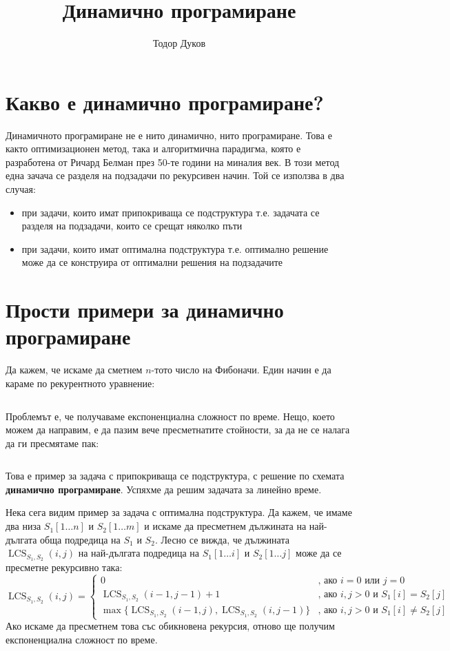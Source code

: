 \documentclass{article}
\title{Динамично програмиране}
\author{Тодор Дуков}
\date{}
\theoremstyle{definition}
\theoremstyle{plain}
\theoremstyle{remark}
\theoremstyle{definition}
\begin{document}
\maketitle

\section*{Какво е динамично програмиране?}

Динамичното програмиране не е нито динамично, нито програмиране.
Това е както оптимизационен метод, така и алгоритмична парадигма, която е разработена от Ричард Белман през 50-те години на миналия век.
В този метод една зачача се разделя на подзадачи по рекурсивен начин.
Той се използва в два случая:
\begin{itemize}
  \item при задачи, които имат припокриваща се подструктура т.е. задачата се разделя на подзадачи, които се срещат няколко пъти
  \item при задачи, които имат оптимална подструктура т.е. оптимално решение може да се конструира от оптимални решения на подзадачите
\end{itemize}

\section*{Прости примери за динамично програмиране}

Да кажем, че искаме да сметнем $n$-тото число на Фибоначи.
Един начин е да караме по рекурентното уравнение:
\inputminted[linenos]{c++}{algorithms/fibonacci_recursive.cpp}
Проблемът е, че получаваме експоненциална сложност по време.
Нещо, което можем да направим, е да пазим вече пресметнатите стойности, за да не се налага да ги пресмятаме пак:
\inputminted[linenos]{c++}{algorithms/fibonacci_dp.cpp}
Това е пример за задача с припокриваща се подструктура, с решение по схемата \textbf{динамично програмиране}.
Успяхме да решим задачата за линейно време.

Нека сега видим пример за задача с оптимална подструктура.
Да кажем, че имаме два низа $S_1[1 \dots n]$ и $S_2[1 \dots m]$ и искаме да пресметнем дължината на най-дългата обща подредица на $S_1$ и $S_2$.
Лесно се вижда, че дължината $\operatorname{LCS}_{S_1, S_2}(i, j)$ на най-дългата подредица на $S_1[1 \dots i]$ и $S_2[1 \dots j]$ може да се пресметне рекурсивно така:
\[
  \operatorname{LCS}_{S_1, S_2}(i, j) = \begin{cases}
    0                                                                                          & \text{, ако } i = 0 \text{ или } j = 0               \\
    \operatorname{LCS}_{S_1, S_2}(i - 1, j - 1) + 1                                            & \text{, ако } i, j > 0 \text{ и } S_1[i] = S_2[j]    \\
    \max\{ \operatorname{LCS}_{S_1, S_2}(i - 1, j), \operatorname{LCS}_{S_1, S_2}(i, j - 1) \} & \text{, ако } i, j > 0 \text{ и } S_1[i] \neq S_2[j]
  \end{cases}
\]
Ако искаме да пресметнем това със обикновена рекурсия, отново ще получим експоненциална сложност по време.
\end{document}
